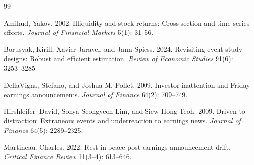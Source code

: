 \documentclass[11pt]{article}
\begin{document}
\newpage
\begin{thebibliography}{99}

Amihud, Yakov. 2002.
Illiquidity and stock returns: Cross-section and time-series effects.
\textit{Journal of Financial Markets} 5(1): 31--56.

Borusyak, Kirill, Xavier Jaravel, and Jann Spiess. 2024.
Revisiting event-study designs: Robust and efficient estimation.
\textit{Review of Economic Studies} 91(6): 3253--3285.

DellaVigna, Stefano, and Joshua M. Pollet. 2009.
Investor inattention and Friday earnings announcements.
\textit{Journal of Finance} 64(2): 709--749.

Hirshleifer, David, Sonya Seongyeon Lim, and Siew Hong Teoh. 2009.
Driven to distraction: Extraneous events and underreaction to earnings news.
\textit{Journal of Finance} 64(5): 2289--2325.

Martineau, Charles. 2022.
Rest in peace post-earnings announcement drift.
\textit{Critical Finance Review} 11(3--4): 613--646.

\end{thebibliography}
\end{document}
